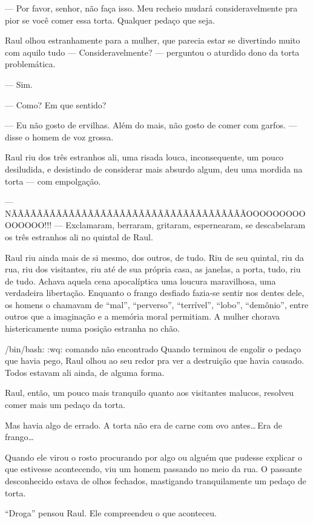 --- Por favor, senhor, não faça isso. Meu recheio mudará consideravelmente pra pior se você comer essa torta. Qualquer pedaço que seja.

Raul olhou estranhamente para a mulher, que parecia estar se divertindo muito com aquilo tudo --- Consideravelmente? --- perguntou o aturdido dono da torta problemática.

--- Sim.

--- Como? Em que sentido?

--- Eu não gosto de ervilhas. Além do mais, não gosto de comer com garfos. --- disse o homem de voz grossa.

Raul riu dos três estranhos ali, uma risada louca, inconsequente, um pouco desiludida, e desistindo de considerar mais absurdo algum, deu uma mordida na torta --- com empolgação.

--- N\-Ã\-Ã\-Ã\-Ã\-Ã\-Ã\-Ã\-Ã\-Ã\-Ã\-Ã\-Ã\-Ã\-Ã\-Ã\-Ã\-Ã\-Ã\-Ã\-Ã\-Ã\-Ã\-ÃÃ\-Ã\-Ã\-Ã\-Ã\-Ã\-Ã\-Ã\-Ã\-Ã\-Ã\-Ã\-Ã\-Ã\-O\-O\-O\-O\-O\-O\-O\-O\-O\-O\-O\-O\-O\-O\-O!!! --- Exclamaram, berraram, gritaram, espernearam, se descabelaram os três estranhos ali no quintal de Raul.

Raul riu ainda mais de si mesmo, dos outros, de tudo. Riu de seu quintal, riu da rua, riu dos visitantes, riu até de sua própria casa, as janelas, a porta, tudo, riu de tudo. Achava aquela cena apocalíptica uma loucura maravilhosa, uma verdadeira libertação. Enquanto o frango desfiado fazia-se sentir nos dentes dele, os homens o chamavam de ``mal'', ``perverso'', ``terrível'', ``lobo'', ``demônio'', entre outros que a imaginação e a memória moral permitiam. A mulher chorava histericamente numa posição estranha no chão.

/bin/bash: :wq: comando não encontrado
Quando terminou de engolir o pedaço que havia pego, Raul olhou ao seu redor pra ver a destruição que havia causado. Todos estavam ali ainda, de alguma forma.

Raul, então, um pouco mais tranquilo quanto aos visitantes malucos, resolveu comer mais um pedaço da torta.

Mas havia algo de errado. A torta não era de carne com ovo antes\ldots\,Era de frango\ldots

Quando ele virou o rosto procurando por algo ou alguém que pudesse explicar o que estivesse acontecendo, viu um homem passando no meio da rua. O passante desconhecido estava de olhos fechados, mastigando tranquilamente um pedaço de torta.

``Droga'' pensou Raul. Ele compreendeu o que aconteceu.

